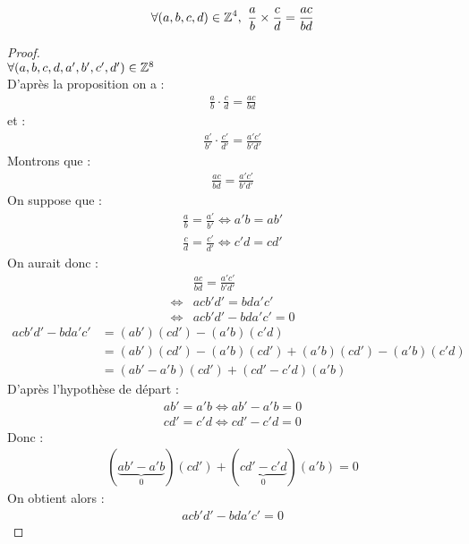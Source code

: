 \begin{proposition}
	\begin{align*}
		\forall (a, b, c, d) \in \mathbb{Z}^4,\ \frac{a}{b} \times \frac{c}{d} = \frac{ac}{bd}
	\end{align*}
\end{proposition}
\begin{proof}~
	\\
	$\forall (a, b, c, d, a', b', c', d') \in \mathbb{Z}^8$\\
	D'après la proposition on a :
	\begin{align*}
		\frac{a}{b} \cdot \frac{c}{d} = \frac{ac}{bd}
	\end{align*}
	et :
	\begin{align*}
		\frac{a'}{b'} \cdot \frac{c'}{d'} = \frac{a'c'}{b'd'}
	\end{align*}
	Montrons que :
	\begin{align*}
		\frac{ac}{bd} = \frac{a'c'}{b'd'}
	\end{align*}
	On suppose que : 
	\begin{align*}
		\frac{a}{b} = \frac{a'}{b'} \iff a'b = ab' \\
		\frac{c}{d} = \frac{c'}{d'} \iff c'd = cd'
	\end{align*}
	On aurait donc :
	\begin{align*}
		&\frac{ac}{bd} = \frac{a'c'}{b'd'} \\
		\iff &acb'd' = bda'c' \\
		\iff &acb'd' - bda'c' = 0
	\end{align*}
	\begin{align*}
		acb'd' - bda'c' &= (ab')(cd') - (a'b)(c'd) \\
		&= (ab')(cd') - (a'b)(cd') + (a'b)(cd') - (a'b)(c'd) \\
		&= (ab' - a'b)(cd') + (cd' - c'd)(a'b)
	\end{align*}
	D'après l'hypothèse de départ :
	\begin{align*}
		ab' = a'b \iff ab' - a'b = 0 \\
		cd' = c'd \iff cd' - c'd = 0
	\end{align*}
	Donc :
	\begin{align*}
		(\underbrace{ab' - a'b}_0)(cd') + (\underbrace{cd' - c'd}_0)(a'b) = 0
	\end{align*}
	On obtient alors :
	\begin{align*}
		acb'd' - bda'c' = 0
	\end{align*}
\end{proof}
